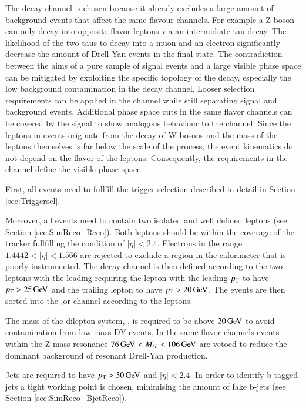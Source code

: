 The \emu decay channel is chosen because it already excludes a large amount of background events that affect the same flavour channels.
For example a Z boson can only decay into opposite flavor leptons via an intermidiate tau decay. The likelihood of the two taus to decay into a muon and an electron significantly decrease the amount of Drell-Yan events in the \emu final state.  
The contradiction between the aims of a pure sample of signal events and a large visible phase space can be mitigated by exploiting the specific topology of the \ttbar decay, especially the low background contamination in the \emu decay channel. 
Looser selection requirements can be applied in the \emu channel while still separating signal and background events.
Additional phase space cuts in the same flavor channels can be covered by the \ttbar signal to show analogous behaviour to the \emu channel. Since the leptons in \ttbar events originate from the decay of W bosons and the
mass of the leptons themselves is far below the scale of the process, the event kinematics do not depend on the flavor of the leptons.
Consequently, the requirements in the \emu channel define the visible phase space.

First, all events need to fullfill the trigger selection described in detail in Section \ref{sec:Triggersel}.

Moreover, all events need to contain two isolated and well defined leptons (see Section \ref{sec:SimReco_Reco}).
Both leptons should be within the coverage of the tracker fullfilling the condition of $|\eta| < 2.4$.
Electrons in the range $1.4442<|\eta|<1.566$ are rejected to exclude a region in the calorimeter that is poorly instrumented.
The decay channel is then defined according to the two leptons with the leading \pt requiring the lepton with the leading $p_{\mathrm{T}}$ to have $p_{\mathrm{T}} > 25 \,\text{Ge\hspace{-.08em}V}$
and the trailing lepton to have $p_{\mathrm{T}} > 20 \,\text{Ge\hspace{-.08em}V}$. 
The events are then sorted into the \mumu,\ee or \mumu channel according to the leptons.

The mass of the dilepton system, \mll, is required to be above $ 20 \,\text{Ge\hspace{-.08em}V}$ to avoid contamination from low-mass DY events.
In the same-flavor channels events within the Z-mass resonance $76 \,\text{Ge\hspace{-.08em}V} < M_{\ell\ell} <106 \,\text{Ge\hspace{-.08em}V}$ are vetoed to reduce the dominant background of 
resonant Drell-Yan production.

Jets are required to have $p_{\mathrm{T}} > 30 \,\text{Ge\hspace{-.08em}V}$ and $|\eta|<2.4$. In order to identify b-tagged jets a tight working point is chosen, minimising the amount of fake b-jets (see Section \ref{sec:SimReco_BjetReco}).

